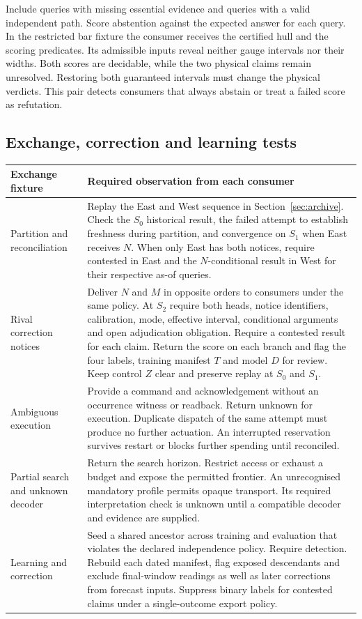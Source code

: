 \documentclass[11pt,a4paper]{article}
\newcommand{\topic}[1]{\par\smallskip{\sffamily\bfseries\color{ink}#1\par}\nobreak}
\begin{document}
\topic{Scoring an abstention}
Include queries with missing essential evidence and queries with a valid independent path. Score abstention against the expected answer for each query. In the restricted bar fixture the consumer receives the certified hull and the scoring predicates. Its admissible inputs reveal neither gauge intervals nor their widths. Both scores are decidable, while the two physical claims remain unresolved. Restoring both guaranteed intervals must change the physical verdicts. This pair detects consumers that always abstain or treat a failed score as refutation.

\clearpage
{}
\subsection*{Exchange, correction and learning tests}
\small
\begin{tabularx}{\linewidth}{@{}L{.23\linewidth}Y@{}}
\toprule
\textbf{Exchange fixture} & \textbf{Required observation from each consumer} \\ \midrule
Partition and reconciliation & Replay the East and West sequence in Section~\ref{sec:archive}. Check the $S_0$ historical result, the failed attempt to establish freshness during partition, and convergence on $S_1$ when East receives $N$. When only East has both notices, require contested in East and the $N$-conditional result in West for their respective as-of queries. \\
Rival correction notices & Deliver $N$ and $M$ in opposite orders to consumers under the same policy. At $S_2$ require both heads, notice identifiers, calibration, mode, effective interval, conditional arguments and open adjudication obligation. Require a contested result for each claim. Return the score on each branch and flag the four labels, training manifest $T$ and model $D$ for review. Keep control $Z$ clear and preserve replay at $S_0$ and $S_1$. \\
Ambiguous execution & Provide a command and acknowledgement without an occurrence witness or readback. Return unknown for execution. Duplicate dispatch of the same attempt must produce no further actuation. An interrupted reservation survives restart or blocks further spending until reconciled. \\
Partial search and unknown decoder & Return the search horizon. Restrict access or exhaust a budget and expose the permitted frontier. An unrecognised mandatory profile permits opaque transport. Its required interpretation check is unknown until a compatible decoder and evidence are supplied. \\
Learning and correction & Seed a shared ancestor across training and evaluation that violates the declared independence policy. Require detection. Rebuild each dated manifest, flag exposed descendants and exclude final-window readings as well as later corrections from forecast inputs. Suppress binary labels for contested claims under a single-outcome export policy. \\
\bottomrule
\end{tabularx}
\normalsize
\end{document}
